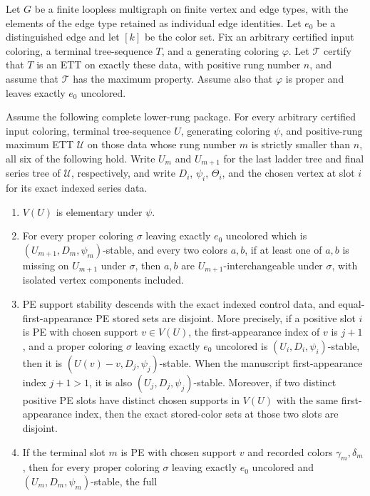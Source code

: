 \begin{lemma}
Let $G$ be a finite loopless multigraph on finite vertex and edge types,
with the elements of the edge type retained as individual edge identities.
Let $e_0$ be a distinguished edge and let $[k]$ be the color set.  Fix an
arbitrary certified input coloring, a terminal tree-sequence $T$, and a
generating coloring $\varphi$.  Let $\mathcal T$ certify that $T$ is an ETT
on exactly these data, with positive rung number $n$, and assume that
$\mathcal T$ has the maximum property.  Assume also that $\varphi$ is
proper and leaves exactly $e_0$ uncolored.

Assume the following complete lower-rung package.  For every arbitrary
certified input coloring, terminal tree-sequence $U$, generating coloring
$\psi$, and positive-rung maximum ETT $\mathcal U$ on those data whose rung
number $m$ is strictly smaller than $n$, all six of the following hold.
Write $U_m$ and $U_{m+1}$ for the last ladder tree and final series tree of
$\mathcal U$, respectively, and write $D_i$, $\psi_i$, $\Theta_i$, and the
chosen vertex at slot $i$ for its exact indexed series data.
\begin{enumerate}
\item $V(U)$ is elementary under $\psi$.
\item For every proper coloring $\sigma$ leaving exactly $e_0$ uncolored
which is $(U_{m+1},D_m,\psi_m)$-stable, and every two colors $a,b$, if at
least one of $a,b$ is missing on $U_{m+1}$ under $\sigma$, then $a,b$ are
$U_{m+1}$-interchangeable under $\sigma$, with isolated vertex components
included.
\item PE support stability descends with the exact indexed control data,
and equal-first-appearance PE stored sets are disjoint.  More precisely,
if a positive slot $i$ is PE with chosen support $v\in V(U)$, the
first-appearance index of $v$ is $j+1$, and a proper coloring $\sigma$
leaving exactly $e_0$ uncolored is $(U_i,D_i,\psi_i)$-stable, then it is
$(U(v)-v,D_j,\psi_j)$-stable.  When the manuscript first-appearance
index $j+1>1$, it is also $(U_j,D_j,\psi_j)$-stable.  Moreover,
if two distinct positive PE slots have distinct chosen supports in $V(U)$
with the same first-appearance index, then the exact stored-color sets at
those two slots are disjoint.
\item If the terminal slot $m$ is PE with chosen support $v$ and recorded
colors $\gamma_m,\delta_m$, then for every proper coloring $\sigma$ leaving
exactly $e_0$ uncolored and $(U_m,D_m,\psi_m)$-stable, the full

\end{enumerate}
\end{lemma}
